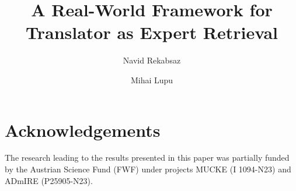 


\title{A Real-World Framework for Translator as Expert Retrieval}


\author{Navid Rekabsaz \and Mihai Lupu}
%
%
%



\maketitle


\begin{abstract}

\end{abstract}









\section*{Acknowledgements}
The research leading to the results presented in this paper was partially funded by the Austrian Science Fund (FWF) under projects MUCKE (I 1094-N23) and ADmIRE (P25905-N23).






